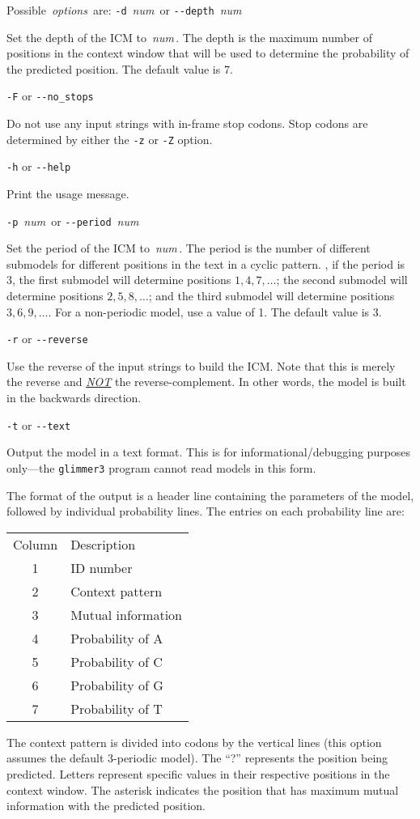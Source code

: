 \documentclass[fleqn,titlepage,11pt]{article}
\def\Desc#1{\,\mbox{\emph{#1}}\,}
\def\Pg#1{\texttt{#1}}
\begin{document}
Possible \Desc{options} are:
\bl{}\RaggedRight
\exdent
  \verb`-d` \Desc{num} \enskip or \enskip \verb`--depth` \Desc{num}

  Set the depth of the ICM to \Desc{num}.  The depth is the
  maximum number of positions in the context window that
  will be used to determine the probability of the predicted
  position.  The default value is 7.

\exdent
  \verb`-F` \enskip or \enskip \verb`--no_stops`

  Do not use any input strings with in-frame stop codons.
  Stop codons are determined by either the \Pg{-z} or \Pg{-Z}
  option.

\exdent
  \verb`-h` \enskip or \enskip \verb`--help`

  Print the usage message.

\exdent
  \verb`-p` \Desc{num} \enskip or \enskip \verb`--period` \Desc{num}

  Set the period of the ICM to \Desc{num}.  The period is the
  number of different submodels for different positions in the
  text in a cyclic pattern.  \Eg, if the period is 3, the first
  submodel will determine positions $1, 4, 7, \dots$; the second
  submodel will determine positions $2, 5, 8, \dots$; and the third
  submodel will determine positions $3, 6, 9, \dots$.  For a
  non-periodic model, use a value of 1.  The default value
  is 3.

\exdent
  \verb`-r` \enskip or \enskip \verb`--reverse`

  Use the reverse of the input strings to build the ICM.  Note that
  this is merely the reverse and \emph{\underline{NOT}} the
  reverse-complement.  In other words, the model is built in
  the backwards direction.

\exdent
  \verb`-t` \enskip or \enskip \verb`--text`

  Output the model in a text format.  This is for
  informational/debugging purposes only---the \Pg{glimmer3}
  program cannot read models in this form.

  The format of the output is a header line containing the
  parameters of the model, followed by individual
  probability lines.  The entries on each probability line
  are:
  \bq
    \begin{tabular}{cl}
      Column & \quad Description \\
      1 & ID number \\
      2 & Context pattern \\
      3 & Mutual information \\
      4 & Probability of A \\
      5 & Probability of C \\
      6 & Probability of G \\
      7 & Probability of T
    \end{tabular}
  \eq
  The context pattern is divided into codons by the vertical lines (this
  option assumes the default 3-periodic model).
  The ``?'' represents the position being predicted.  Letters represent
  specific values in their respective positions in the context window.
  The asterisk indicates the position that has maximum mutual information
  with the predicted position.
\end{document}
